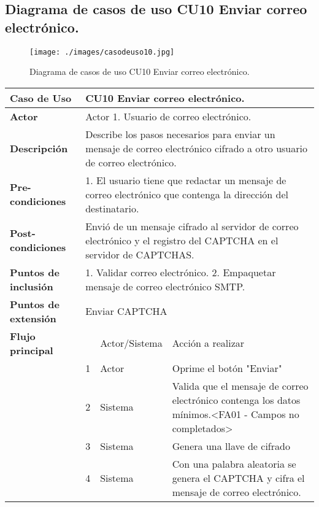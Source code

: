 \documentclass[12pt,oneside,onecolumn,openany]{report}
\begin{document}
\pagebreak
\subsection{Diagrama de casos de uso CU10 Enviar correo electrónico.}
\begin{figure}[H]
	\texttt{[image: ./images/casodeuso10.jpg]}
	\caption{Diagrama de casos de uso CU10 Enviar correo electrónico.}
	\label{fig:4-11-1}
\end{figure}
\begin{table}[H]
 \centering
   {
     \begin{tabular}{| p{} | p{} |p{4cm}|p{5cm}|}
     \hline
     \textbf{Caso de Uso} &\multicolumn{3}{|l|}{CU10 Enviar correo electrónico.}\\
     \hline
     \textbf{Actor} & \multicolumn{3}{|l|}{Actor 1. Usuario de correo electrónico.}\\
     \hline
     \textbf{Descripción} & \multicolumn{3}{|p{10cm}|}{Describe los pasos necesarios para enviar un mensaje de correo electrónico cifrado a otro usuario de correo electrónico.}\\
     \hline
     \textbf{Pre-condiciones} & \multicolumn{3}{|p{10cm}|}{1. El usuario tiene que redactar un mensaje de correo electrónico que contenga la dirección del destinatario.}\\
     \hline
     \textbf{Post-condiciones} & \multicolumn{3}{|p{10cm}|}{Envió de un mensaje cifrado al servidor de correo electrónico y el registro del CAPTCHA en el servidor de CAPTCHAS.}\\
     \hline
     \textbf{Puntos de inclusión} & \multicolumn{3}{|p{10cm}|}{1. Validar correo electrónico. 2. Empaquetar mensaje de correo electrónico SMTP.}\\
     \hline
     \textbf{Puntos de extensión} & \multicolumn{3}{|l|}{Enviar CAPTCHA}\\
     \hline
     \textbf{Flujo principal} & & Actor/Sistema & Acción a realizar\\
     \hline
     & 1 & Actor & Oprime el botón "Enviar"\\
     \hline
     & 2 & Sistema & Valida que el mensaje de correo electrónico contenga los datos mínimos.<FA01 - Campos no completados>\\
     \hline
     & 3 & Sistema & Genera una llave de cifrado\\
     \hline
     & 4 & Sistema & Con una palabra aleatoria se genera el CAPTCHA y cifra el mensaje de correo electrónico.\\

\end{tabular}}
\end{table}
\end{document}
